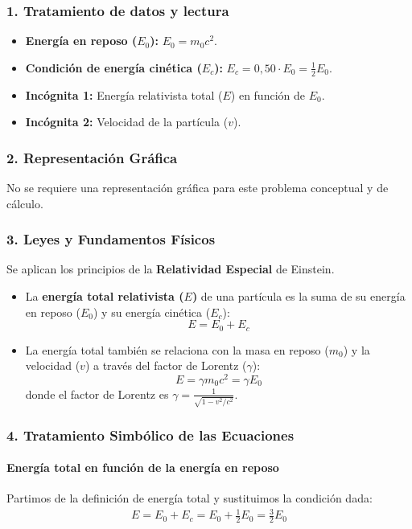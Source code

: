 \subsubsection*{1. Tratamiento de datos y lectura}
\begin{itemize}
    \item \textbf{Energía en reposo ($E_0$):} $E_0 = m_0 c^2$.
    \item \textbf{Condición de energía cinética ($E_c$):} $E_c = 0,50 \cdot E_0 = \frac{1}{2} E_0$.
    \item \textbf{Incógnita 1:} Energía relativista total ($E$) en función de $E_0$.
    \item \textbf{Incógnita 2:} Velocidad de la partícula ($v$).
\end{itemize}

\subsubsection*{2. Representación Gráfica}
No se requiere una representación gráfica para este problema conceptual y de cálculo.

\subsubsection*{3. Leyes y Fundamentos Físicos}
Se aplican los principios de la \textbf{Relatividad Especial} de Einstein.
\begin{itemize}
    \item La \textbf{energía total relativista ($E$)} de una partícula es la suma de su energía en reposo ($E_0$) y su energía cinética ($E_c$):
    $$ E = E_0 + E_c $$
    \item La energía total también se relaciona con la masa en reposo ($m_0$) y la velocidad ($v$) a través del factor de Lorentz ($\gamma$):
    $$ E = \gamma m_0 c^2 = \gamma E_0 $$
    donde el factor de Lorentz es $\gamma = \frac{1}{\sqrt{1 - v^2/c^2}}$.
\end{itemize}

\subsubsection*{4. Tratamiento Simbólico de las Ecuaciones}
\paragraph{Energía total en función de la energía en reposo}
Partimos de la definición de energía total y sustituimos la condición dada:
\begin{gather}
    E = E_0 + E_c = E_0 + \frac{1}{2}E_0 = \frac{3}{2}E_0
\end{gather}
